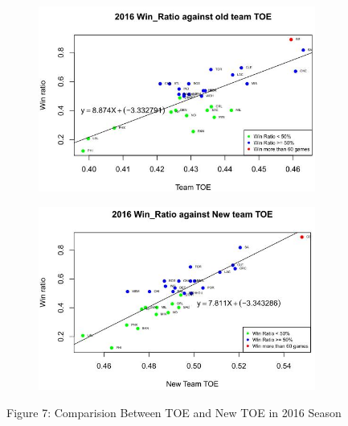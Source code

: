 \documentclass[11pt]{article}
\begin{document}
\begin{figure}[h!]
  \centering
  \begin{subfigure}[b]{0.45\linewidth}
    \includegraphics[width=\linewidth]{16old.jpg}
  \end{subfigure}
  \begin{subfigure}[b]{0.45\linewidth}
    \includegraphics[width=\linewidth]{16new.jpg}
  \end{subfigure}
\bigskip

Figure 7: Comparision Between TOE and New TOE in 2016 Season
\end{figure}
\end{document}
